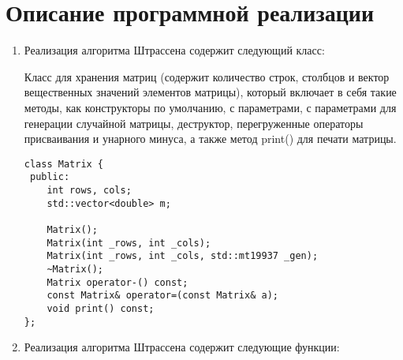 \documentclass{report}
\begin{document}
\section*{Описание программной реализации}
\begin {enumerate}
\item Реализация алгоритма Штрассена содержит следующий класс:

Класс для хранения матриц (содержит количество строк, столбцов и вектор вещественных значений элементов матрицы), который включает в себя такие методы, как конструкторы по умолчанию, с параметрами, с параметрами для генерации случайной матрицы, деструктор, перегруженные операторы присваивания и унарного минуса, а также метод print() для печати матрицы.
\begin{lstlisting}
class Matrix {
 public:
    int rows, cols;
    std::vector<double> m;

    Matrix();
    Matrix(int _rows, int _cols);
    Matrix(int _rows, int _cols, std::mt19937 _gen);
    ~Matrix();
    Matrix operator-() const;
    const Matrix& operator=(const Matrix& a);
    void print() const;
}; 
\end{lstlisting}
\item Реализация алгоритма Штрассена содержит следующие функции:
\end{enumerate}
\end{document}
